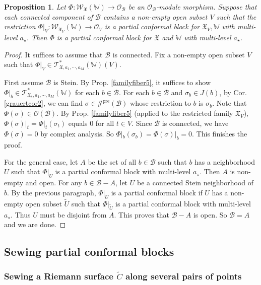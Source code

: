 \documentclass[11pt,b5paper,notitlepage]{article}
\theoremstyle{definition}
\theoremstyle{plain}
\newtheorem{pp}[df]{Proposition}
\newcommand{\fk}{\mathfrak}
\newcommand{\mc}{\mathcal}
\newcommand{\wtd}{\widetilde}
\newcommand{\scr}{\mathscr}
\newcommand{\Wbb}{\mathbb W}
\newcommand{\<}{\left\langle}
\renewcommand{\>}{\right\rangle}
\newcommand{\MO}{\mathcal{O}}
\newcommand{\MB}{\mathcal{B}}
\newcommand{\fx}{\mathfrak{X}}
\newcommand{\ST}{\mathscr{T}}
\newcommand{\SW}{\mathscr{W}}
\newcommand{\pre}{\mathrm{pre}}
\numberwithin{equation}{section}
\begin{document}
\begin{pp}\label{localglobal1}
    Let $\Phi:\SW_\fx(\Wbb)\rightarrow \MO_\MB$ be an $\MO_\MB$-module morphism. Suppose that each connected component of $\MB$ contains a non-empty open subset $V$ such that the restriction $\Phi|_V:\SW_{\fx_V}(\Wbb)\rightarrow \MO_V$ is a partial conformal block for $\fk X_V,\Wbb$ with multi-level $a_\star$. Then $\Phi$ is a partial conformal block for $\fx$ and $\Wbb$ with multi-level $a_\star$.
\end{pp}
\begin{proof}
It suffices to assume that $\MB$ is connected. Fix a non-empty open subset $V$ such that $\Phi\vert_V\in \ST_{\fx,a_1,\cdots,a_M}^*(\Wbb)(V)$.
     
First assume $\MB$ is Stein. By Prop. \ref{familyfiber5}, it suffices to show $\Phi\vert_b\in \ST_{\fx_b,a_1,\cdots,a_M}^*(\Wbb)$ for each $b\in \MB$. For each $b\in \MB$ and $\sigma_b\in J(b)$, by Cor. \ref{grauertcor2}, we can find $\sigma\in \scr J^\pre(\mc B)$ whose restriction to $b$ is $\sigma_b$. Note that $\Phi(\sigma)\in\mc O(\mc B)$. By Prop. \ref{familyfiber5} (applied to the restricted family $\fk X_V$), $\Phi(\sigma)\vert_t=\Phi\vert_t(\sigma_t)$ equals $0$ for all $t\in V$. Since $\mc B$ is connected, we have $\Phi(\sigma)=0$ by complex analysis. So $\Phi|_b(\sigma_b)=\Phi(\sigma)|_b=0$. This finishes the proof.
     
For the general case, let $A$ be the set of all $b\in \MB$ such that $b$ has a neighborhood $U$ such that $\Phi\vert_U$ is a partial conformal block with multi-level $a_\star$. Then $A$ is non-empty and open. For any $b\in \MB-A$, let $U$ be a connected Stein neighborhood of $b$. By the previous paragraph, $\Phi\vert_U$ is a partial conformal block if $U$ has a non-empty open subset $\wtd U$ such that $\Phi\vert_{\wtd U}$ is a partial conformal block with multi-level $a_\star$. Thus $U$ must be disjoint from $A$. This proves that $\MB-A$ is open. So $\MB=A$ and we are done.
\end{proof}



\subsection{Sewing partial conformal blocks}\label{lb76}


\subsubsection{Sewing a Riemann surface $\wtd C$ along several pairs of points} \label{lb6}
\end{document}
